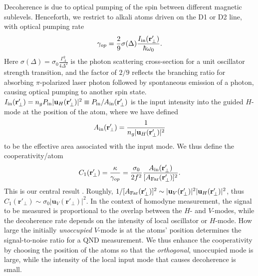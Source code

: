 \documentclass[preprint,aps,pra,onecolumn,superscriptaddress]{revtex4-1} %
\newcommand{\mbf}[1]{\mathbf{#1}}
\newcommand{\AF}{A_{\rm Far}} %
\newcommand{\Ai}{A_{\rm in}} %
\begin{document}
Decoherence is due to optical pumping of the spin between different magnetic sublevels.  Henceforth, we restrict to alkali atoms driven on the D1 or D2 line, with optical pumping rate 
\begin{equation}
\gamma_{op} =\frac{2}{9} \sigma(\Delta) \frac{I_{\rm in}(\mbf{r}'_\perp)}{\hbar \omega_0}.
\end{equation}
Here $\sigma(\Delta) = \sigma_0 \frac{\Gamma_A^2}{4 \Delta^2}$ is the photon scattering cross-section for a unit oscillator strength transition, {\color{blue}and the factor of $2/9$ reflects the branching ratio for absorbing $\pi$-polarized laser photon followed by spontaneous emission of a photon, causing optical pumping to another spin state.} $I_{\rm in}(\mbf{r}'_\perp) = n_g P_{\rm in}\vert \mbf{u}_H (\mbf{r}'_\perp)  \vert^2 \equiv P_{\rm in}/\Ai(\mbf{r}'_\perp) $ is the input intensity into the guided $H$-mode at the position of the atom,  where we have defined
\begin{equation}\label{eq:Ain}
\Ai(\mbf{r}'_\perp) =  \frac{1}{n_g \vert \mbf{u}_H (\mbf{r}'_\perp) \vert ^2}
\end{equation}
to be the effective area associated with the input mode.  We thus define the cooperativity/atom
\begin{equation}\label{eq:C1}
C_1 (\mbf{r}'_\perp)  = \frac{\kappa}{\gamma_{op}} =\frac{\sigma_0}{2f^2} \frac{  \Ai(\mbf{r}'_\perp) }{[\AF(\mbf{r}'_\perp)]^2}.
\end{equation}
This is our central result .  Roughly, $1/[\AF(\mbf{r}'_\perp)]^2 \sim \vert \mbf{u}_V (\mbf{r}'_\perp) \vert ^2 \vert \mbf{u}_H (\mbf{r}'_\perp) \vert ^2$, thus $ C_1(\mbf{r}'_\perp) \sim \sigma_0 \vert \mbf{u}_V (\mbf{r}'_\perp) \vert ^2$. In the context of homodyne measurement, the signal to be measured is proportional to the overlap between the $ H $- and $ V $-modes, while the decoherence rate depends on the intensity of local oscillator or $ H $-mode. How large the initially {\em unoccupied} $ V $-mode is at the atoms' position determines the signal-to-noise ratio for a QND measurement.  We thus enhance the cooperativity by choosing the position of the atoms so that the {\em orthogonal}, unoccupied mode is large, while the intensity of the local input mode that causes decoherence is small.
\end{document}
